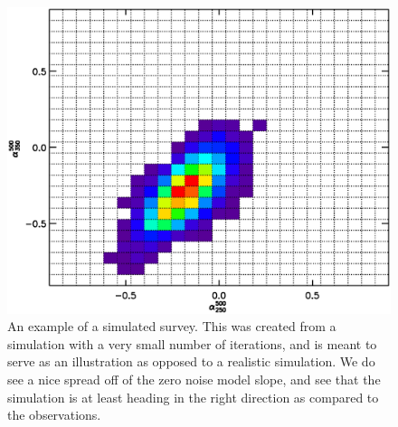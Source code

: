 \documentclass[twocolumn,letterpaper,10pt]{article}
\begin{document}
\begin{figure}
\includegraphics[width=\textwidth]{model_color_hist.eps}
\caption{An example of a simulated survey. This was created from a simulation with a very small number of iterations, and is meant to serve as an illustration as opposed to a realistic simulation. We do see a nice spread off of the zero noise model slope, and see that the simulation is at least heading in the right direction as compared to the observations.}
\label{simmed}
\end{figure}
\end{document}
